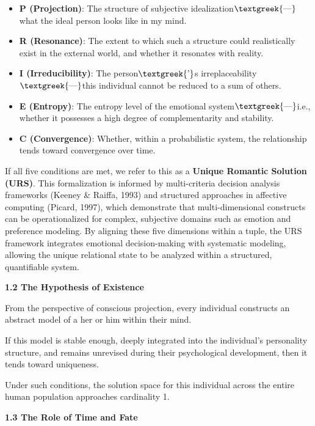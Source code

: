 \documentclass[a4paper]{article}
\begin{document}
\begin{itemize}[series=listWWNumi,label=[F0B7?]]
\item \textbf{P (Projection)}: The structure of subjective idealization$\text{\textgreek{—}}${\textquotedbl}what the
ideal person looks like in my mind.{\textquotedbl}
\item \textbf{R (Resonance)}: The extent to which such a structure could realistically exist in the external world, and
whether it resonates with reality.
\item \textbf{I (Irreducibility)}: The person$\text{\textgreek{’}}$s irreplaceability$\text{\textgreek{—}}$this
individual cannot be reduced to a sum of others.
\item \textbf{E (Entropy)}: The entropy level of the emotional system$\text{\textgreek{—}}$i.e., whether it possesses a
high degree of complementarity and stability.
\item \textbf{C (Convergence)}: Whether, within a probabilistic system, the relationship tends toward convergence over
time.
\end{itemize}
If all five conditions are met, we refer to this as a \textbf{Unique Romantic Solution (URS)}.\newline
This formalization is informed by multi-criteria decision analysis frameworks (Keeney \& Raiffa, 1993) and structured
approaches in affective computing (Picard, 1997), which demonstrate that multi-dimensional constructs can be
operationalized for complex, subjective domains such as emotion and preference modeling. By aligning these five
dimensions within a tuple, the URS framework integrates emotional decision-making with systematic modeling, allowing
the unique relational state to be analyzed within a structured, quantifiable system. 

\textbf{1.2 The Hypothesis of Existence}

From the perspective of conscious projection, every individual constructs an abstract model of a
{\textquotedbl}her{\textquotedbl} or {\textquotedbl}him{\textquotedbl} within their mind.

If this model is stable enough, deeply integrated into the individual's personality structure, and remains unrevised
during their psychological development, then it tends toward uniqueness.

Under such conditions, the solution space for this individual across the entire human population approaches cardinality
1.

\textbf{1.3 The Role of Time and Fate}
\end{document}
